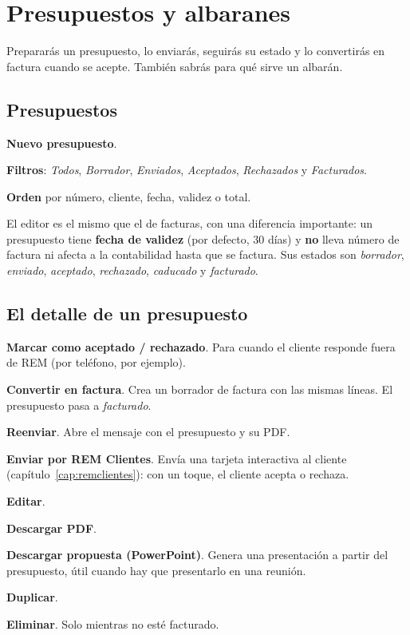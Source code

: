 \chapter{Presupuestos y albaranes}\label{cap:presupuestos}

\begin{objbox}
Prepararás un presupuesto, lo enviarás, seguirás su estado y lo convertirás en factura cuando se acepte. También sabrás para qué sirve un albarán.
\end{objbox}

\section{Presupuestos}
\begin{leyenda}
\item[\mk{1}] \textbf{Nuevo presupuesto}.
\item[\mk{2}] \textbf{Filtros}: \emph{Todos}, \emph{Borrador}, \emph{Enviados}, \emph{Aceptados}, \emph{Rechazados} y \emph{Facturados}.
\item[\mk{3}] \textbf{Orden} por número, cliente, fecha, validez o total.
\end{leyenda}
El editor es el mismo que el de facturas, con una diferencia importante: un presupuesto tiene \textbf{fecha de validez} (por defecto, 30 días) y \textbf{no} lleva número de factura ni afecta a la contabilidad hasta que se factura. Sus estados son \emph{borrador}, \emph{enviado}, \emph{aceptado}, \emph{rechazado}, \emph{caducado} y \emph{facturado}.

\section{El detalle de un presupuesto}
\begin{leyenda}
\item[\mk{1}] \textbf{Marcar como aceptado / rechazado}. Para cuando el cliente responde fuera de REM (por teléfono, por ejemplo).
\item[\mk{2}] \textbf{Convertir en factura}. Crea un borrador de factura con las mismas líneas. El presupuesto pasa a \emph{facturado}.
\item[\mk{3}] \textbf{Reenviar}. Abre el mensaje con el presupuesto y su PDF.
\item[\mk{4}] \textbf{Enviar por REM Clientes}. Envía una tarjeta interactiva al cliente (capítulo~\ref{cap:remclientes}): con un toque, el cliente acepta o rechaza.
\item[\mk{5}] \textbf{Editar}.
\item[\mk{6}] \textbf{Descargar PDF}.
\item[\mk{7}] \textbf{Descargar propuesta (PowerPoint)}. Genera una presentación a partir del presupuesto, útil cuando hay que presentarlo en una reunión.
\item[\mk{8}] \textbf{Duplicar}.
\item[\mk{9}] \textbf{Eliminar}. Solo mientras no esté facturado.
\end{leyenda}

